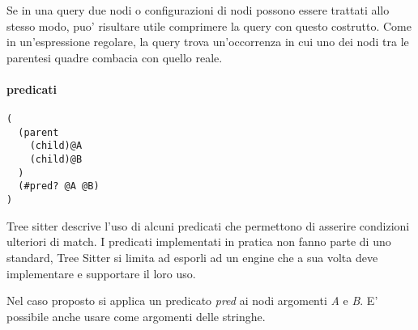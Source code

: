 Se in una query due nodi o configurazioni di nodi possono essere trattati allo stesso modo, puo' risultare utile comprimere la query con questo costrutto.
Come in un'espressione regolare, la query trova un'occorrenza in cui uno dei nodi tra le parentesi quadre combacia con quello reale.


\paragraph{predicati}

\begin{verbatim}
(
  (parent
    (child)@A
    (child)@B
  )
  (#pred? @A @B)
)
\end{verbatim}

Tree sitter descrive l'uso di alcuni predicati che permettono di asserire condizioni ulteriori di match.
I predicati implementati in pratica non fanno parte di uno standard, Tree Sitter si limita ad esporli ad un engine che a sua volta deve implementare e supportare il loro uso.

Nel caso proposto si applica un predicato \emph{pred} ai nodi argomenti \emph{A} e \emph{B}.
E' possibile anche usare come argomenti delle stringhe.
